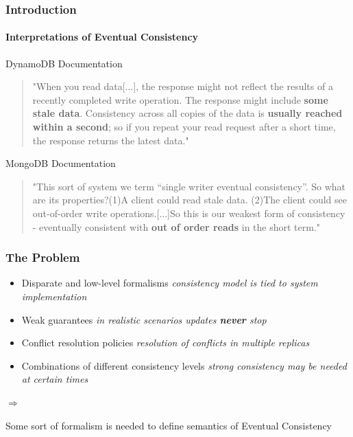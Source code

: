 \documentclass[11pt]{beamer}
\begin{document}
\begin{frame}
\frametitle{Introduction}
\framesubtitle{Interpretations of Eventual Consistency}
\begin{footnotesize}
DynamoDB Documentation
\begin{quotation}
"When you read data[...], the response might not reflect the results of a recently completed write operation. The response might include \textbf{some stale data}. Consistency across all copies of the data is \textbf{usually reached within a second}; so if you repeat your read request after a short time, the response returns the latest data."
\end{quotation}

MongoDB Documentation
\begin{quotation}
"This sort of system we term “single writer eventual consistency”. So what are its properties?\linebreak (1)A client could read stale data. \linebreak(2)The client could see out-of-order write operations.[...]\linebreak So this is our weakest form of consistency - eventually consistent with \textbf{out of order reads} in the short term."
\end{quotation}
\end{footnotesize}
\end{frame}

\begin{frame}
\frametitle{The Problem}
\begin{itemize}
  \item Disparate and low-level formalisms\linebreak 
  \textit{consistency model is tied to system implementation}
  \item Weak guarantees\linebreak 
  \textit{in realistic scenarios updates \textbf{never} stop}
  \item Conflict resolution policies\linebreak 
  \textit{resolution of conflicts in multiple replicas}
  \item Combinations of different consistency levels\linebreak 
  \textit{strong consistency may be needed at certain times}
  
\end{itemize}
\begin{large}
\ensuremath{\Rightarrow}
\end{large}
Some sort of formalism is needed to define semantics of Eventual Consistency
\end{frame}
\end{document}
